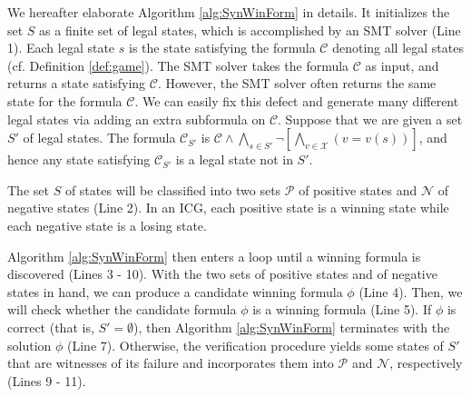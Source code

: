 \documentclass[review]{elsarticle}
\newcommand{\statevar}{\mathcal{X}}
\newcommand{\positiveSet}{\mathcal{P}}
\newcommand{\negativeSet}{\mathcal{N}}
\newcommand{\constraint}{\mathcal{C}}
\newcommand\ie{{\it i.e.}}
\newcommand{\featureSet}{\Psi}
\begin{document}
	We hereafter elaborate Algorithm \ref{alg:SynWinForm} in details.
	It initializes the set $S$ as a finite set of legal states, which is accomplished by an SMT solver (Line 1).
	Each legal state $s$ is the state satisfying the formula $\constraint$ denoting all legal states (cf. Definition \ref{def:game}).
	The SMT solver takes the formula $\constraint$ as input, and returns a state satisfying $\constraint$.
	However, the SMT solver often returns the same state for the formula $\constraint$.
	We can easily fix this defect and generate many different legal states via adding an extra subformula on $\constraint$.
	Suppose that we are given a set $S'$ of legal states.
	The formula $\constraint_{S'}$ is $\constraint \land \bigwedge_{s \in S'} \neg [\bigwedge_{v \in \statevar}(v = v(s))]$, and hence any state satisfying $\constraint_{S'}$ is a legal state not in $S'$.

	The set $S$ of states will be classified into two sets $\positiveSet$ of positive states and $\negativeSet$ of negative states (Line 2).
	In an ICG, each positive state is a winning state while each negative state is a losing state.

	Algorithm \ref{alg:SynWinForm} then enters a loop until a winning formula is discovered (Lines 3 - 10).
	With the two sets of positive states and of negative states in hand, we can produce a candidate winning formula $\phi$ (Line 4). %
	Then, we will check whether the candidate formula $\phi$ is a winning formula (Line 5). %
	If $\phi$ is correct (that is, $S' = \emptyset$), then Algorithm \ref{alg:SynWinForm} terminates with the solution $\phi$ (Line 7).
	Otherwise, the verification procedure yields some states of $S'$ that are witnesses of its failure and incorporates them into $\positiveSet$ and $\negativeSet$, respectively (Lines 9 - 11).
\end{document}

